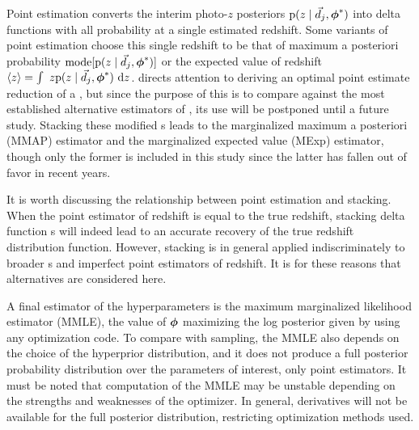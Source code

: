 Point estimation converts the interim photo-$z$ posteriors $\mathrm{p}(z \mid \vec{d}_{j}, {\boldsymbol{\phi}}^{*})$ into delta functions with all probability at a single estimated redshift.  
Some variants of point estimation choose this single redshift to be that of maximum a posteriori probability $\mathrm{mode}[\mathrm{p}(z \mid \vec{d}_{j}, {\boldsymbol{\phi}}^{*})]$ or the expected value of redshift $\langle z \rangle = \int\ z \mathrm{p}(z \mid \vec{d}_{j}, {\boldsymbol{\phi}}^{*})\ \mathrm{d} z$.
\cite{tanaka_photometric_2018} directs attention to deriving an optimal point estimate reduction of a \pzpdf, but since the purpose of this \paper is to compare against the most established alternative estimators of \nz, its use will be postponed until a future study.
Stacking these modified \pzpdf s leads to the marginalized maximum a posteriori (MMAP) estimator and the marginalized expected value (MExp) estimator, though only the former is included in this study since the latter has fallen out of favor in recent years.

It is worth discussing the relationship between point estimation and stacking.  
When the point estimator of redshift is equal to the true redshift, stacking delta function \pzpdf s will indeed lead to an accurate recovery of the true redshift distribution function.  
However, stacking is in general applied indiscriminately to broader \pzpdf s and imperfect point estimators of redshift.  
It is for these reasons that alternatives are considered here.

A final estimator of the hyperparameters is the maximum marginalized likelihood estimator (MMLE), the value of ${\boldsymbol{\phi}}$ maximizing the log posterior given by  using any optimization code.  
To compare with sampling, the MMLE also depends on the choice of the hyperprior distribution, and it does not produce a full posterior probability distribution over the parameters of interest, only point estimators.  
It must be noted that computation of the MMLE may be unstable depending on the strengths and weaknesses of the optimizer.  
In general, derivatives will not be available for the full posterior distribution, restricting optimization methods used.

